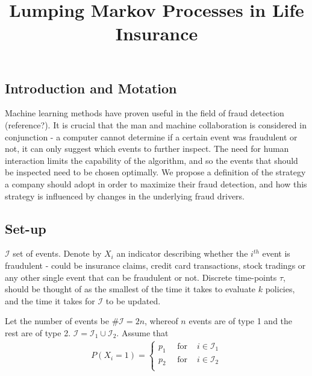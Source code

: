 \documentclass[12pt]{article}
\theoremstyle{my_thm}
\theoremstyle{definition}
\theoremstyle{my_def}
\newenvironment{exa1}
  {\pushQED{\qed}\renewcommand{\qedsymbol}{$\triangle$}\examplexA}
  {\popQED\endexamplexA}
\numberwithin{SubExCount1}{ExCount1}
\begin{document}
\renewcommand{\arraystretch}{1.5}
\captionsetup{width=0.8\textwidth}

\title{Lumping Markov Processes in Life Insurance}
%
%

\subsection*{Introduction and Motation}
Machine learning methods have proven useful in the field of fraud detection (reference?). It is crucial that the man and machine collaboration is considered in conjunction - a computer cannot determine if a certain event was fraudulent or not, it can only suggest which events to further inspect. The need for human interaction limits the capability of the algorithm, and so the events that should be inspected need to be chosen optimally. We propose a definition of the strategy a company should adopt in order to maximize their fraud detection, and how this strategy is influenced by changes in the underlying fraud drivers.


\subsection*{Set-up}
$\mathcal{I}$ set of events. Denote by $X_i$ an indicator describing whether the $i^{th}$ event is fraudulent - could be insurance claims, credit card transactions, stock tradings or any other single event that can be fraudulent or not. Discrete time-points $\tau$, should be thought of as the smallest of the time it takes to evaluate $k$ policies, and the time it takes for $\mathcal{I}$ to be updated.


\begin{exa1}
Let the number of events be $\# \mathcal{I}=2n$, whereof $n$ events are of type 1 and the rest are of type 2. $\mathcal{I}=\mathcal{I}_1 \cup \mathcal{I}_2$. Assume that 
\begin{align*}
P(X_i=1)=
\begin{cases}
p_1 \quad \text{ for }& i \in \mathcal{I}_1\\
p_2 \quad \text{ for }& i \in \mathcal{I}_2\\
\end{cases}
\end{align*}
\end{exa1}
\end{document}
